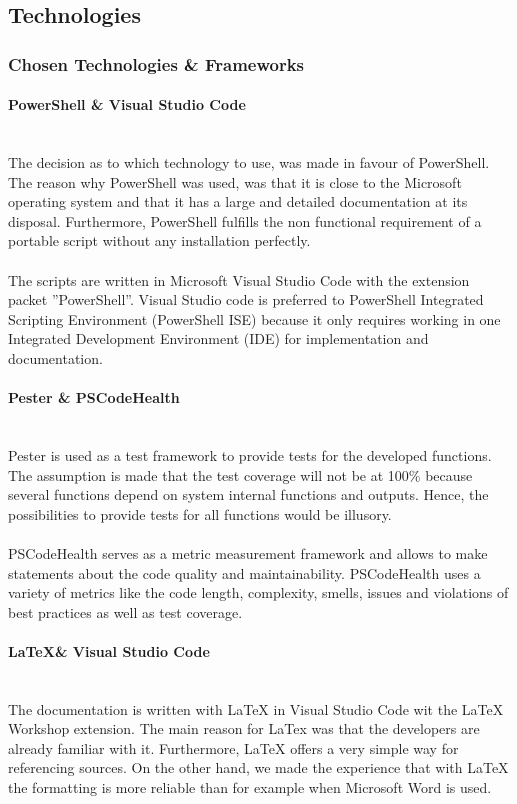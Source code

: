 \clearpage

\subsection{Technologies}
\subsubsection{Chosen Technologies \& Frameworks}
\paragraph{PowerShell \& Visual Studio Code} \ \\
The decision as to which technology to use, was made in favour of PowerShell. The reason why PowerShell was used, was that it is close to the Microsoft operating system and that it has a large and detailed documentation at its disposal. Furthermore, PowerShell fulfills the non functional requirement of a portable script without any installation perfectly.\ \\
\ \\
The scripts are written in Microsoft Visual Studio Code \cite{VSCode} with the extension packet ''PowerShell''. Visual Studio code is preferred to PowerShell Integrated Scripting Environment (PowerShell ISE) because it only requires working in one Integrated Development Environment (IDE) for implementation and documentation.

\paragraph{Pester \& PSCodeHealth} \ \\
Pester \cite{Pester} is used as a test framework to provide tests for the developed functions. The assumption is made that the test coverage will not be at 100\% because several functions depend on system internal functions and outputs. Hence, the possibilities to provide tests for all functions would be illusory. 
\\\\
PSCodeHealth \cite{PSCodeHealth} serves as a metric measurement framework and allows to make statements about the code quality and maintainability. PSCodeHealth uses a variety of metrics like the code length, complexity, smells, issues and violations of best practices as well as test coverage. 

\paragraph{\LaTeX \& Visual Studio Code}\ \\
The documentation is written with LaTeX in Visual Studio Code wit the LaTeX Workshop extension. The main reason for LaTex was that the developers are already familiar with it. Furthermore, LaTeX offers a very simple way for referencing sources. On the other hand, we made the experience that with LaTeX the formatting is more reliable than for example when Microsoft Word is used.

